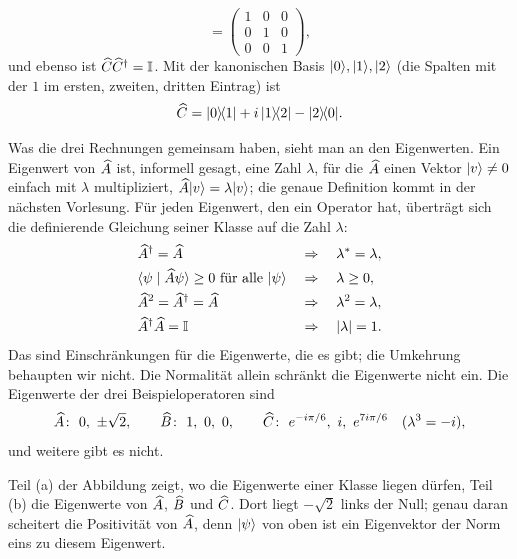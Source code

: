 \begin{beispiel}
\begin{equation}
		= \begin{pmatrix} 1 & 0 & 0 \\ 0 & 1 & 0 \\ 0 & 0 & 1 \end{pmatrix},
	\end{equation}
	und ebenso ist $\widehat{C}\widehat{C}^{\dagger} = \mathbb{I}$. Mit der kanonischen Basis $\lvert 0 \rangle,\lvert 1 \rangle,\lvert 2 \rangle$ (die Spalten mit der $1$ im ersten, zweiten, dritten Eintrag) ist
	\begin{equation}
		\widehat{C} = \lvert 0 \rangle\!\langle 1 \rvert + i\,\lvert 1 \rangle\!\langle 2 \rvert - \lvert 2 \rangle\!\langle 0 \rvert.
	\end{equation}
\end{beispiel}

Was die drei Rechnungen gemeinsam haben, sieht man an den Eigenwerten. Ein Eigenwert von $\widehat{A}$ ist, informell gesagt, eine Zahl $\lambda$, für die $\widehat{A}$ einen Vektor $\lvert v \rangle \neq 0$ einfach mit $\lambda$ multipliziert, $\widehat{A}\lvert v \rangle = \lambda\lvert v \rangle$; die genaue Definition kommt in der nächsten Vorlesung. Für jeden Eigenwert, den ein Operator hat, überträgt sich die definierende Gleichung seiner Klasse auf die Zahl $\lambda$:
\begin{equation}
	\begin{aligned}
		&\widehat{A}^{\dagger} = \widehat{A} &&\Rightarrow\quad \lambda^* = \lambda, \\
		&\langle \psi \mid \widehat{A}\psi \rangle \geq 0 \text{ für alle } \lvert \psi \rangle &&\Rightarrow\quad \lambda \geq 0, \\
		&\widehat{A}^2 = \widehat{A}^{\dagger} = \widehat{A} &&\Rightarrow\quad \lambda^2 = \lambda, \\
		&\widehat{A}^{\dagger}\widehat{A} = \mathbb{I} &&\Rightarrow\quad \left\lvert \lambda \right\rvert = 1.
	\end{aligned}
\end{equation}
Das sind Einschränkungen für die Eigenwerte, die es gibt; die Umkehrung behaupten wir nicht. Die Normalität allein schränkt die Eigenwerte nicht ein. Die Eigenwerte der drei Beispieloperatoren sind
\begin{equation}
	\op{A}\colon\ 0,\ \pm \sqrt{2}, \qquad
	\op{B}\colon\ 1,\ 0,\ 0, \qquad
	\op{C}\colon\ e^{-i\pi/6},\ i,\ e^{7i\pi/6} \quad (\lambda^3 = -i),
\end{equation}
und weitere gibt es nicht.




Teil (a) der Abbildung zeigt, wo die Eigenwerte einer Klasse liegen dürfen, Teil (b) die Eigenwerte von $\widehat{A}$, $\widehat{B}$ und $\widehat{C}$. Dort liegt $-\sqrt{2}$ links der Null; genau daran scheitert die Positivität von $\widehat{A}$, denn $\lvert \psi \rangle$ von oben ist ein Eigenvektor der Norm eins zu diesem Eigenwert.
